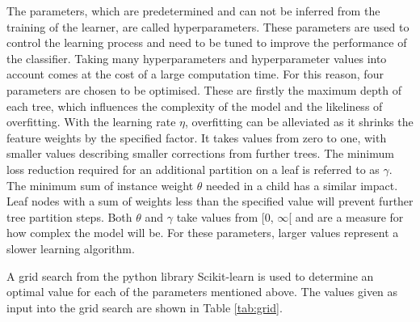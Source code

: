 The parameters, which are predetermined and can not be inferred from the training of the learner, are called hyperparameters. These parameters are used
to control the learning process and need to be tuned to improve the performance of the classifier.
Taking many hyperparameters and hyperparameter values into account comes at the
cost of a large computation time. For this reason, four parameters are chosen to be optimised. These are firstly the maximum depth of each tree, which influences the
complexity of the model and the likeliness of overfitting. With the learning rate $\eta$, overfitting can be alleviated as it shrinks the feature weights
by the specified factor. It takes values from zero to one, with smaller values describing smaller corrections from further trees.
The minimum loss reduction required for an additional partition on a leaf is referred to as $\gamma$. The minimum sum of instance weight $\theta$
needed in a child has a similar impact. Leaf nodes with a sum of weights less than the specified value will prevent further tree partition steps.
Both $\theta$ and $\gamma$ take values from [0, $\infty$[ and are a measure for how complex the model will be.
For these parameters, larger values represent a slower learning algorithm.

A grid search from the python \cite{python} library Scikit-learn \cite{scikit} is used to determine an optimal
value for each of the parameters mentioned above. The values given as input into the grid search
are shown in Table \ref{tab:grid}.


